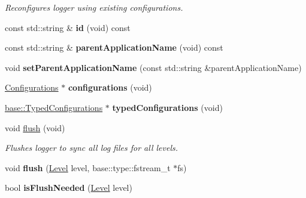 \begin{DoxyCompactItemize}
\begin{DoxyCompactList}\small\item\em Reconfigures logger using existing configurations. \end{DoxyCompactList}\item 
\mbox{\label{classel_1_1_logger_a8583bfdeea4cb781396fd635addd64e9}} 
const std\+::string \& {\bfseries id} (void) const
\item 
\mbox{\label{classel_1_1_logger_a7e736c63c196cfed54a40ad7abc79155}} 
const std\+::string \& {\bfseries parent\+Application\+Name} (void) const
\item 
\mbox{\label{classel_1_1_logger_a6890af8910adba26b01ef029429c4f15}} 
void {\bfseries set\+Parent\+Application\+Name} (const std\+::string \&parent\+Application\+Name)
\item 
\mbox{\label{classel_1_1_logger_aeb57aeaddbb3dcd0cb96114019817142}} 
\hyperlink{classel_1_1_configurations}{Configurations} $\ast$ {\bfseries configurations} (void)
\item 
\mbox{\label{classel_1_1_logger_ac1d34e77892ea506b011d5279b6b139d}} 
\hyperlink{classel_1_1base_1_1_typed_configurations}{base\+::\+Typed\+Configurations} $\ast$ {\bfseries typed\+Configurations} (void)
\item 
\mbox{\label{classel_1_1_logger_a9a89d454008b1ee1a197eec4b92ce22a}} 
void \hyperlink{classel_1_1_logger_a9a89d454008b1ee1a197eec4b92ce22a}{flush} (void)
\begin{DoxyCompactList}\small\item\em Flushes logger to sync all log files for all levels. \end{DoxyCompactList}\item 
\mbox{\label{classel_1_1_logger_a83c85278ebeeef6a24cc112e56c344dd}} 
void {\bfseries flush} (\hyperlink{namespaceel_ab0ac6091262344c52dd2d3ad099e8e36}{Level} level, base\+::type\+::fstream\+\_\+t $\ast$fs)
\item 
\mbox{\label{classel_1_1_logger_abdf56c00388c71d1cbaa7e2df4449202}} 
bool {\bfseries is\+Flush\+Needed} (\hyperlink{namespaceel_ab0ac6091262344c52dd2d3ad099e8e36}{Level} level)

\end{DoxyCompactItemize}
